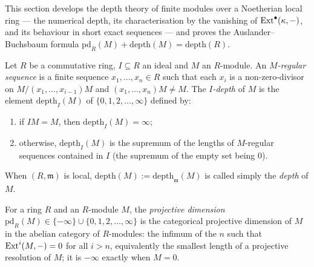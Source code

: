 This section develops the depth theory of finite modules over a Noetherian local ring
--- the numerical depth, its characterisation by the vanishing of
\(\operatorname{Ext}^{\bullet}(\kappa, -)\), and its behaviour in short exact sequences --- and proves
the Auslander--Buchsbaum formula
\(\mathrm{pd}_R(M) + \mathrm{depth}(M) = \mathrm{depth}(R)\).

\begin{definition}
  \label{pa-def:depth}
  \leanok

  Let \(R\) be a commutative ring, \(I \subseteq R\) an ideal and \(M\) an \(R\)-module.
  An \emph{\(M\)-regular sequence} is a finite sequence \(x_1, \dots, x_n \in R\) such
  that each \(x_i\) is a non-zero-divisor on \(M/(x_1, \dots, x_{i-1})M\) and
  \((x_1, \dots, x_n)M \neq M\). The \emph{\(I\)-depth} of \(M\) is the element
  \(\mathrm{depth}_I(M)\) of \(\{0, 1, 2, \dots, \infty\}\) defined by:
  \begin{enumerate}
    \item if \(IM = M\), then \(\mathrm{depth}_I(M) = \infty\);
    \item otherwise, \(\mathrm{depth}_I(M)\) is the supremum of the lengths of
      \(M\)-regular sequences contained in \(I\) (the supremum of the empty set
      being \(0\)).
  \end{enumerate}
  When \((R, \mathfrak m)\) is local, \(\mathrm{depth}(M) := \mathrm{depth}_{\mathfrak m}(M)\)
  is called simply the \emph{depth} of \(M\).
\end{definition}

\begin{definition}
  \label{pa-def:projectiveDimension}
  \leanok

  For a ring \(R\) and an \(R\)-module \(M\), the \emph{projective dimension}
  \(\mathrm{pd}_R(M) \in \{-\infty\} \cup \{0, 1, 2, \dots, \infty\}\) is the categorical
  projective dimension of \(M\) in the abelian category of \(R\)-modules: the infimum of
  the \(n\) such that \(\operatorname{Ext}^i(M, -) = 0\) for all \(i > n\), equivalently the smallest
  length of a projective resolution of \(M\); it is \(-\infty\) exactly when \(M = 0\).
\end{definition}


